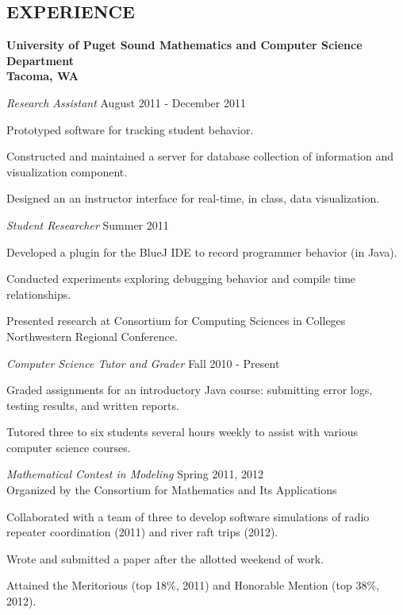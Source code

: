 \documentclass[line,margin,11pt]{res}
\newenvironment{itemize*}%
  {\begin{itemize}%
    \setlength{\parsep}{0pt}
    \setlength{\itemsep}{0pt}%
    \setlength{\parskip}{0pt}}%
  {\end{itemize}}
\begin{document}
\begin{resume}
\vspace*{.2cm} 

\section{EXPERIENCE} 
\textbf{University of Puget Sound
Mathematics and Computer Science Department\\
Tacoma, WA}

{\sl Research Assistant} \hfill August 2011 - December 2011
\begin{itemize*}
    \item Prototyped software for tracking student behavior.
    \item Constructed and maintained a server for database collection of 
      information and visualization component.
    \item Designed an an instructor interface for real-time, in class, data 
      visualization.
\end{itemize*}            
{\sl Student Researcher} \hfill  Summer 2011
\begin{itemize*}  
    \item Developed a plugin for the BlueJ IDE to record 
      programmer behavior (in Java).
    \item Conducted experiments exploring debugging behavior and compile 
      time relationships.
    \item Presented research at Consortium for Computing Sciences in 
      Colleges Northwestern Regional Conference.
\end{itemize*} 
{\sl Computer Science Tutor and Grader} \hfill Fall 2010 - Present
\begin{itemize*}  
    \item Graded assignments for an introductory Java course: submitting 
      error logs, testing results, and written reports.
    \item Tutored three to six students several hours weekly to assist with 
      various computer science courses.
\end{itemize*}

{\sl Mathematical Contest in Modeling} \hfill Spring 2011, 2012\\
Organized by the Consortium for Mathematics and Its Applications
\begin{itemize*}
\item Collaborated with a team of three to develop software 
  simulations of radio repeater coordination (2011) and river raft trips 
  (2012).
\item Wrote and submitted a paper after the allotted weekend of work.
\item Attained the Meritorious (top 18\%, 2011) and Honorable 
    Mention (top 38\%, 2012).
\end{itemize*}

\end{resume}
\end{document}
